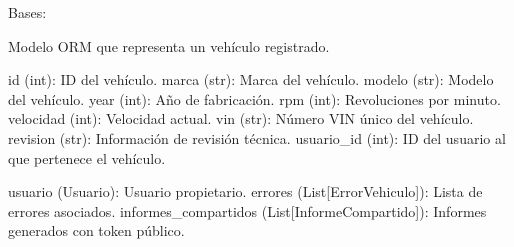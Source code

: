 \documentclass[letterpaper,10pt,spanish]{sphinxmanual}
\begin{document}
\begin{fulllineitems}
\label{\detokenize{modelos:main.Vehiculo}}
\pysigstartsignatures
\pysiglinewithargsret
{}
{}
{}
\pysigstopsignatures
\sphinxAtStartPar
Bases: {\hyperref[\detokenize{modelos:main.Base}]{}}

\sphinxAtStartPar
Modelo ORM que representa un vehículo registrado.
\begin{description}
\sphinxAtStartPar
id (int): ID del vehículo.
marca (str): Marca del vehículo.
modelo (str): Modelo del vehículo.
year (int): Año de fabricación.
rpm (int): Revoluciones por minuto.
velocidad (int): Velocidad actual.
vin (str): Número VIN único del vehículo.
revision (str): Información de revisión técnica.
usuario\_id (int): ID del usuario al que pertenece el vehículo.

\sphinxAtStartPar
usuario (Usuario): Usuario propietario.
errores (List{[}ErrorVehiculo{]}): Lista de errores asociados.
informes\_compartidos (List{[}InformeCompartido{]}): Informes generados con token público.

\end{description}

\end{fulllineitems}

\end{document}
